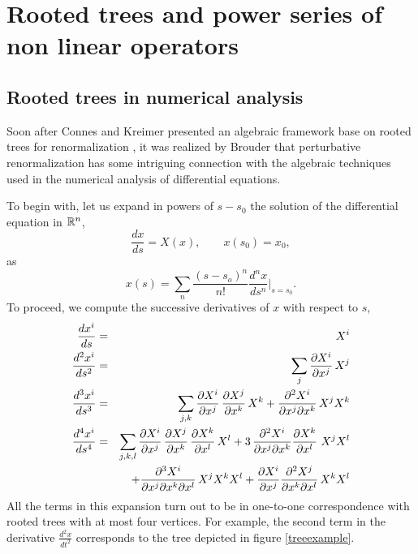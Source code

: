 \documentclass[12pt,here,feynmf]{article}
\begin{document}
\section{Rooted trees and power series of non linear operators}



\subsection{Rooted trees in numerical analysis}

Soon after Connes and Kreimer presented an algebraic framework base on rooted trees for renormalization \cite{ck0}, it was realized by Brouder \cite{brouder} that perturbative renormalization  has some intriguing connection with the algebraic techniques used in the numerical analysis of differential equations.

To begin with, let us expand in powers of $s-s_{0}$ the solution of the differential equation in ${\Bbb R}^{n}$, 
\begin{equation}
\frac{dx}{ds}=X(x),\qquad x(s_{0})=x_{0},\label{diffeq}
\end{equation}
as
\begin{equation}
x(s)=\sum_{n}\frac{(s-s_{o})^{n}}{n!}\frac{d^{n}x}{ds^{n}}\Big|_{s=s_{0}}.
\end{equation}
To proceed, we compute the successive derivatives of $x$ with respect to $s$,
\begin{eqnarray}
\frac{dx^{i}}{ds}&=&X^{i}\cr
\frac{d^{2}x^{i}}{ds^{2}}&=&\sum_{j}\frac{\partial X^{i}}{\partial x^{j}}\,X^{j}\cr
\frac{d^{3}x^{i}}{ds^{3}}&=&\sum_{j,k}\frac{\partial X^{i}}{\partial x^{j}}
\,\frac{\partial X^{j}}{\partial x^{k}}\,X^{k}
+\frac{\partial^{2}X^{i}}{\partial x^{j}\partial x^{k}}\,X^{j}X^{k}\cr
\frac{d^{4}x^{i}}{ds^{4}}&=&\sum_{j,k,l}\frac{\partial X^{i}}{\partial x^{j}}\,
\frac{\partial X^{j}}{\partial x^{k}}\,\frac{\partial X^{k}}{\partial x^{l}}\,X^{l}
+3\,\frac{\partial^{2}X^{i}}{\partial x^{j}\partial x^{k}}
\frac{\partial X^{k}}{\partial x^{l}}\,\,X^{j}X^{l}\cr
&&\quad+\frac{\partial^{3} X^{i}}{\partial x^{j}\partial x^{k}\partial x^{l}}
\,X^{j}X^{k}X^{l}
+\frac{\partial X^{i}}{\partial x^{j}}\frac{\partial^{2}X^{j}}{\partial x^{k}\partial x^{l}}\,X^{k}X^{l}
\label{expand}
\end{eqnarray}
All the terms in this expansion turn out to be in one-to-one correspondence with rooted trees with at most four vertices. For example, the second term in the derivative $\frac{d^{2}x}{dt^{2}}$ corresponds to the tree depicted in figure \ref{treeexample}.
\end{document}
